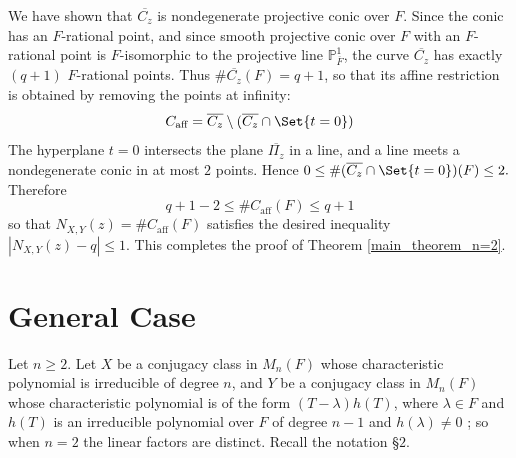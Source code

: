 \documentclass[preprint,11pt]{amsart}
\def\P{\mathbb{P}}
\theoremstyle{definition}
\numberwithin{thm}{section}
\newcommand{\abs}[1]{\left| #1 \right|}
\newcommand{\aff}{\textrm{aff}}
\newcommand{\ol}[1]{\overline{#1}}
\begin{document}
We have shown that $\ol{C_z}$ is nondegenerate projective conic over $F$.  Since the conic has an $F$-rational point, and since smooth projective conic over $F$ with an $F$-rational point is $F$-isomorphic to the projective line $\P^1_{\ol{F}}$, the curve $\ol{C_z}$ has exactly $(q+1)$ $F$-rational points. Thus $\# \ol{C_z}(F) = q + 1$, so that its affine restriction is obtained by removing the points at infinity:
$$
C_{\aff} = \ol{C_z} \setminus ( \ol{C_z} \cap \Set{t = 0})
$$
The hyperplane $t = 0$ intersects the plane $\ol{\Pi_z}$ in a line, and a line meets a nondegenerate conic in at most $2$ points. Hence 
$
0 \leq \#(\ol{C_z} \cap \Set{t = 0})(F) \leq 2.
$
Therefore
$$
q + 1 - 2 \leq \#C_{\aff}(F) \leq q+1
$$
so that $N_{X, Y}(z)= \#C_{\aff}(F)$ satisfies the desired inequality $\abs{N_{X, Y}(z) - q} \leq 1$. This completes the proof of Theorem \ref{main_theorem_n=2}.


\section{General Case}

Let  $n \geq 2$. Let $X$ be a conjugacy class in $M_n(F)$ whose characteristic polynomial is irreducible of degree $n$, and $Y$ be a conjugacy class in $M_n(F)$ whose characteristic polynomial is of the form $(T - \lambda)h(T)$, where $\lambda \in F$ and $h(T)$ is an irreducible polynomial over $F$ of degree $n-1$ and $h(\lambda) \neq 0$ ; so when $n = 2$ the linear factors are distinct. Recall the notation \S $2$.
\end{document}
